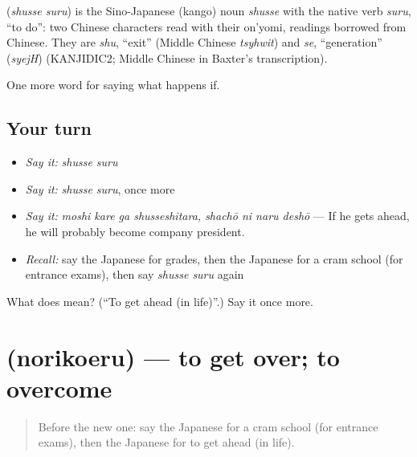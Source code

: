 \begin{cousinweb}
\textbf{} (\emph{shusse suru}) is the Sino-Japanese (kango) noun \emph{shusse} with the native verb \emph{suru}, \textquotedblleft{}to do\textquotedblright{}: two Chinese characters read with their on'yomi, readings borrowed from Chinese. They are \emph{shu}, \textquotedblleft{}exit\textquotedblright{} (Middle Chinese \emph{tsyhwit}) and \emph{se}, \textquotedblleft{}generation\textquotedblright{} (\emph{syejH}) (KANJIDIC2; Middle Chinese in Baxter's transcription).
\end{cousinweb}

\begin{grammarlens}[title={What you've built}]
One more word for saying what happens if.
\end{grammarlens}

\subsection*{Your turn}
\begin{itemize}
\raggedright
  \item \emph{Say it:} \emph{shusse suru}
  \item \emph{Say it:} \emph{shusse suru}, once more
  \item \emph{Say it:} \emph{moshi kare ga shusseshitara, shachō ni naru deshō} — If he gets ahead, he will probably become company president.
  \item \emph{Recall:} say the Japanese for grades, then the Japanese for a cram school (for entrance exams), then say \emph{shusse suru} again
\end{itemize}

\begin{tcolorbox}[breakable,colback=teal!4,colframe=teal!35!black,title={Before you move on}]
What does  mean? (\textquotedblleft{}To get ahead (in life)\textquotedblright{}.) Say it once more.
\end{tcolorbox}
\section[\texorpdfstring{\ja{のりこえる} (norikoeru)}{のりこえる (norikoeru)}]{ (norikoeru) — to get over; to overcome}

\label{lesson:JA-C516-norikoeru}



\begin{quote}
Before the new one: say the Japanese for a cram school (for entrance exams), then the Japanese for to get ahead (in life).
\end{quote}

